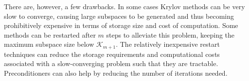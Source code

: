 \documentclass[12pt]{article}
\newcommand{\ve}[1]{\ensuremath{\mathbf{#1}}}
\begin{document}
There are, however, a few drawbacks. In some cases Krylov methods can be very slow to converge, causing large subspaces to be generated and thus becoming prohibitively expensive in terms of storage size and cost of computation. Some methods can be restarted after $m$ steps %
to alleviate this problem, keeping the maximum subspace size below $\mathcal{K}_{m+1}$.  The relatively inexpensive restart techniques can reduce the storage requirements and computational costs associated with a slow-converging problem such that they are tractable. Preconditioners can also help by reducing the number of iterations needed. %

\end{document}
